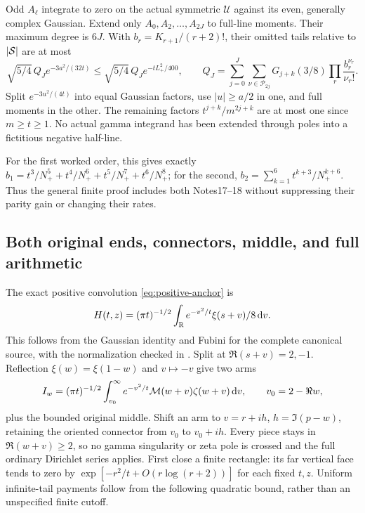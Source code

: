 Odd $A_\ell$ integrate to zero on the actual symmetric $\mathcal U$
against its even, generally complex Gaussian. Extend only
$A_0,A_2,\ldots,A_{2J}$ to full-line moments. Their maximum degree
is $6J$. With $b_r=K_{r+1}/(r+2)!$, their omitted tails relative
to $|\mathcal S|$ are at most
\begin{equation}
 \sqrt{5/4}\,Q_Je^{-3a^2/(32t)}
 \le\sqrt{5/4}\,Q_Je^{-tL_+^2/400},\qquad
 Q_J=\sum_{j=0}^J\sum_{\nu\in\mathcal P_{2j}}
     G_{j+k}(3/8)\prod_r\frac{b_r^{\nu_r}}{\nu_r!}.
 \label{eq:positive-polynomial-tail}
\end{equation}
Split $e^{-3u^2/(4t)}$ into equal Gaussian factors, use
$|u|\ge a/2$ in one, and full moments in the other.
The remaining factors $t^{j+k}/m^{2j+k}$ are at most one since
$m\ge t\ge1$. No actual gamma integrand has been extended through
poles into a fictitious negative half-line.

For the first worked order, this gives exactly
$b_1=t^3/N_+^5+t^4/N_+^6+t^5/N_+^7+t^6/N_+^8$; for the
second, $b_2=\sum_{k=1}^6t^{k+3}/N_+^{k+6}$. Thus the general
finite proof includes both Notes17--18 without suppressing their
parity gain or changing their rates.

\subsection{Both original ends, connectors, middle, and full arithmetic}
The exact positive convolution \eqref{eq:positive-anchor} is
\begin{equation}
 H(t,z)=(\pi t)^{-1/2}\int_\mathbb R e^{-v^2/t}\xi(s+v)/8\,\mathrm d v.
 \label{eq:positive-canonical-integral}
\end{equation}
This follows from the Gaussian identity and Fubini for the complete
canonical source, with the normalization checked in \cite{polymath}.
Split at $\Re(s+v)=2,-1$. Reflection $\xi(w)=\xi(1-w)$ and
$v\mapsto-v$ give two arms
\[
 I_w=(\pi t)^{-1/2}\int_{v_0}^{\infty}
    e^{-v^2/t}\mathcal M(w+v)\zeta(w+v)\,\mathrm d v,\qquad v_0=2-\Re w,
\]
plus the bounded original middle. Shift an arm to
$v=r+ih$, $h=\Im(p-w)$, retaining the oriented connector from
$v_0$ to $v_0+ih$. Every piece stays in $\Re(w+v)\ge2$, so
no gamma singularity or zeta pole is crossed and the full ordinary
Dirichlet series applies. First close a finite rectangle: its far
vertical face tends to zero by
$\exp[-r^2/t+O(r\log(r+2))]$ for each fixed $t,z$.
Uniform infinite-tail payments follow from the following quadratic
bound, rather than an unspecified finite cutoff.

